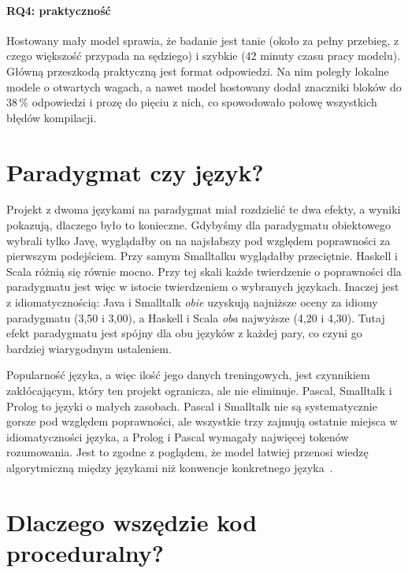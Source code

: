 \paragraph{RQ4: praktyczność} Hostowany mały model sprawia, że badanie jest tanie (około 
za pełny przebieg, z czego większość przypada na sędziego) i szybkie (42 minuty czasu pracy
modelu). Główną przeszkodą praktyczną jest format odpowiedzi. Na nim poległy lokalne modele
o otwartych wagach, a nawet model hostowany dodał znaczniki bloków do 38\,\% odpowiedzi i prozę do
pięciu z nich, co spowodowało połowę wszystkich błędów kompilacji.

\section{Paradygmat czy język?}
\label{sec:paradigm-or-language}

Projekt z dwoma językami na paradygmat miał rozdzielić te dwa efekty, a wyniki pokazują, dlaczego
było to konieczne. Gdybyśmy dla paradygmatu obiektowego wybrali tylko Javę, wyglądałby on na
najsłabszy pod względem poprawności za pierwszym podejściem. Przy samym Smalltalku wyglądałby
przeciętnie. Haskell i Scala różnią się równie mocno. Przy tej skali każde twierdzenie
o poprawności dla paradygmatu jest więc w istocie twierdzeniem o wybranych językach. Inaczej jest
z idiomatycznością: Java i Smalltalk \emph{obie} uzyskują najniższe oceny za idiomy paradygmatu
(3,50 i 3,00), a Haskell i Scala \emph{oba} najwyższe (4,20 i 4,30). Tutaj efekt paradygmatu jest
spójny dla obu języków z każdej pary, co czyni go bardziej wiarygodnym ustaleniem.

Popularność języka, a więc ilość jego danych treningowych, jest czynnikiem zakłócającym, który ten
projekt ogranicza, ale nie eliminuje. Pascal, Smalltalk i Prolog to języki o małych zasobach.
Pascal i Smalltalk nie są systematycznie gorsze pod względem poprawności, ale wszystkie trzy zajmują
ostatnie miejsca w idiomatyczności języka, a Prolog i Pascal wymagały najwięcej tokenów
rozumowania. Jest to zgodne z poglądem, że model łatwiej przenosi wiedzę algorytmiczną między
językami niż konwencje konkretnego języka~\cite{cassano2024knowledge}.

\section{Dlaczego wszędzie kod proceduralny?}
\label{sec:procedural-bias}

